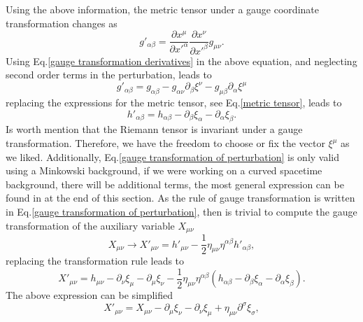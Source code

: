 \documentclass{article}
\begin{document}
Using the above information, the metric tensor under a gauge coordinate transformation
changes as 
\begin{equation}
    g'_{\alpha\beta} = \frac{\partial x^{\mu}}{\partial x'^{\alpha}}
    \frac{\partial x^{\nu}}{\partial x'^{\beta}}g_{\mu\nu}.
\end{equation}
Using Eq.\eqref{gauge transformation derivatives} in the above equation, and neglecting
second order terms in the perturbation, leads to
\begin{equation}
    g'_{\alpha\beta} = g_{\alpha\beta} - g_{\alpha\nu}\partial_{\beta}\xi^{\nu}
    - g_{\mu\beta}\partial_{\alpha}\xi^{\mu}
\end{equation}
replacing the expressions for the metric tensor, see Eq.\eqref{metric tensor}, leads to
\begin{equation}
    \label{gauge transformation of perturbation}
    h'_{\alpha\beta} = h_{\alpha\beta} - \partial_{\beta}\xi_{\alpha} 
    - \partial_{\alpha}\xi_{\beta}.
\end{equation}
Is worth mention that the Riemann tensor is invariant under a gauge transformation. 
Therefore, we have the freedom to choose or fix the vector $\xi^{\mu}$ as we liked. 
Additionally, Eq.\eqref{gauge transformation of perturbation} is only valid using a 
Minkowski background, if we were working on a curved spacetime background, there will
be additional terms, the most general expression can be found in at the end of this 
section. As the rule of gauge transformation is written in 
Eq.\eqref{gauge transformation of perturbation}, then is trivial to compute the gauge
transformation of the auxiliary variable $X_{\mu\nu}$
\begin{equation}
    X_{\mu\nu} \to X'_{\mu\nu} = h'_{\mu\nu} 
    - \frac{1}{2}\eta_{\mu\nu}\eta^{\alpha\beta}h'_{\alpha\beta},
\end{equation}
replacing the transformation rule leads to
\begin{equation}
    X'_{\mu\nu} = h_{\mu\nu} - \partial_{\nu}\xi_{\mu} 
    - \partial_{\mu}\xi_{\nu}
    - \frac{1}{2}\eta_{\mu\nu}\eta^{\alpha\beta}\left(
    h_{\alpha\beta} - \partial_{\beta}\xi_{\alpha} - \partial_{\alpha}\xi_{\beta}\right).
\end{equation}
The above expression can be simplified 
\begin{equation}
    \label{gauge transformation X}
    X'_{\mu\nu} = X_{\mu\nu} - \partial_{\mu}\xi_{\nu} 
    - \partial_{\nu}\xi_{\mu} + \eta_{\mu\nu}\partial^{\sigma}\xi_{\sigma},
\end{equation}
\end{document}
